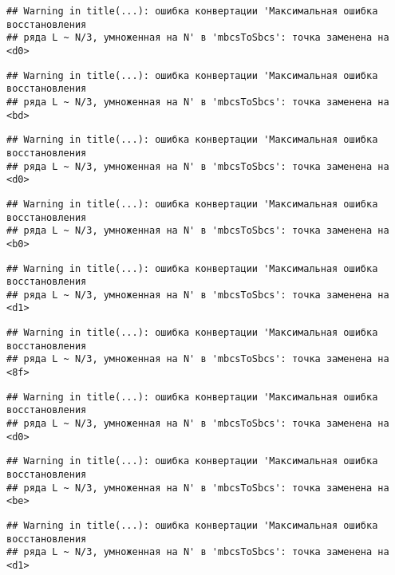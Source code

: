\documentclass[
]{article}
\begin{document}
\begin{verbatim}
## Warning in title(...): ошибка конвертации 'Максимальная ошибка восстановления
## ряда L ~ N/3, умноженная на N' в 'mbcsToSbcs': точка заменена на <d0>
\end{verbatim}

\begin{verbatim}
## Warning in title(...): ошибка конвертации 'Максимальная ошибка восстановления
## ряда L ~ N/3, умноженная на N' в 'mbcsToSbcs': точка заменена на <bd>
\end{verbatim}

\begin{verbatim}
## Warning in title(...): ошибка конвертации 'Максимальная ошибка восстановления
## ряда L ~ N/3, умноженная на N' в 'mbcsToSbcs': точка заменена на <d0>
\end{verbatim}

\begin{verbatim}
## Warning in title(...): ошибка конвертации 'Максимальная ошибка восстановления
## ряда L ~ N/3, умноженная на N' в 'mbcsToSbcs': точка заменена на <b0>
\end{verbatim}

\begin{verbatim}
## Warning in title(...): ошибка конвертации 'Максимальная ошибка восстановления
## ряда L ~ N/3, умноженная на N' в 'mbcsToSbcs': точка заменена на <d1>
\end{verbatim}

\begin{verbatim}
## Warning in title(...): ошибка конвертации 'Максимальная ошибка восстановления
## ряда L ~ N/3, умноженная на N' в 'mbcsToSbcs': точка заменена на <8f>
\end{verbatim}

\begin{verbatim}
## Warning in title(...): ошибка конвертации 'Максимальная ошибка восстановления
## ряда L ~ N/3, умноженная на N' в 'mbcsToSbcs': точка заменена на <d0>
\end{verbatim}

\begin{verbatim}
## Warning in title(...): ошибка конвертации 'Максимальная ошибка восстановления
## ряда L ~ N/3, умноженная на N' в 'mbcsToSbcs': точка заменена на <be>
\end{verbatim}

\begin{verbatim}
## Warning in title(...): ошибка конвертации 'Максимальная ошибка восстановления
## ряда L ~ N/3, умноженная на N' в 'mbcsToSbcs': точка заменена на <d1>
\end{verbatim}
\end{document}
